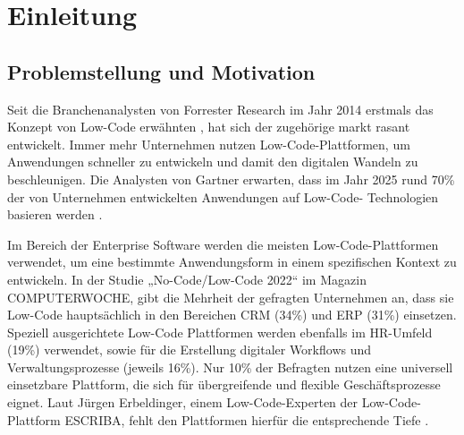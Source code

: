 
\chapter{Einleitung} \label{EL}

\section{Problemstellung und Motivation}
Seit die Branchenanalysten von Forrester Research im Jahr 2014 erstmals das Konzept von Low-Code erwähnten \cite{lcnc:ndp}, hat sich der zugehörige markt rasant entwickelt. Immer mehr Unternehmen nutzen Low-Code-Plattformen, um Anwendungen schneller zu entwickeln und damit den digitalen Wandeln zu beschleunigen. Die Analysten von Gartner erwarten, dass im Jahr 2025 rund 70\% der von Unternehmen entwickelten Anwendungen auf Low-Code- Technologien basieren werden \cite{lcnc:lcp}. 

Im Bereich der Enterprise Software werden die meisten Low-Code-Plattformen verwendet, um eine bestimmte Anwendungsform in einem spezifischen Kontext zu entwickeln. In der Studie „No-Code/Low-Code 2022“ im Magazin COMPUTERWOCHE, gibt die Mehrheit der gefragten Unternehmen an, dass sie Low-Code hauptsächlich in den Bereichen CRM (34\%) und ERP (31\%) einsetzen. Speziell ausgerichtete Low-Code Plattformen werden ebenfalls im HR-Umfeld (19\%)  verwendet, sowie für die Erstellung digitaler Workflows und Verwaltungsprozesse (jeweils 16\%). Nur 10\% der Befragten nutzen eine universell einsetzbare Plattform, die sich für übergreifende und flexible Geschäftsprozesse eignet. Laut Jürgen Erbeldinger, einem Low-Code-Experten der Low-Code-Plattform ESCRIBA, fehlt den Plattformen hierfür die entsprechende Tiefe \cite{lcnc:nclc}.

